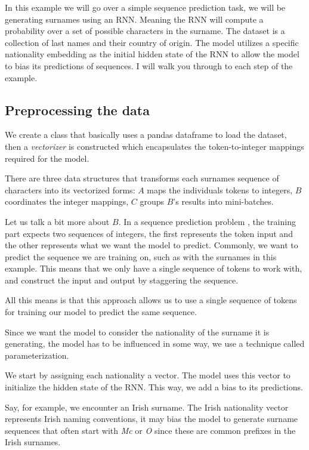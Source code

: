 \documentclass[12pt]{IEEEtran}
\begin{document}
In this example we will go over a simple sequence prediction task, we will be
generating surnames using an RNN. Meaning the RNN will compute a probability
over a set of possible characters in the surname. The dataset is a collection
of last names and their country of origin. The model utilizes a specific
nationality embedding as the initial hidden state of the RNN to allow the model
to bias its predictions of sequences. I will walk you through to each step of
the example.

\subsection{Preprocessing the data}

We create a class that basically  uses a pandas dataframe to load the dataset,
then a \emph{vectorizer} is constructed which encapsulates the token-to-integer
mappings required for the model.

There are three data structures that transforms each surnames sequence of
characters into its vectorized forms: $A$ maps the individuals tokens to
integers, $B$ coordinates the integer mappings, $C$ groups $B$'s results
into mini-batches.

Let us talk a bit more about $B$. In a sequence prediction problem , the
training part expects two sequences of integers, the first represents the
token input and the other represents what we want the model to predict.
Commonly, we want to predict the sequence we are training on, such as with the
surnames in this example. This means that we only have a single sequence of
tokens to work with, and construct the input and output by staggering the
sequence.

All this means is that this approach allows us to use a single sequence of tokens for
training our model to predict the same sequence.

Since we want the model to consider the nationality of the surname it is
generating, the model has to be influenced in some way, we use a technique
called parameterization.

We start by assigning each nationality a vector. The model uses this vector to
initialize the hidden state of the RNN. This way, we add a bias to its
predictions.

Say, for example, we encounter an Irish surname. The Irish nationality vector
represents Irish naming conventions, it may bias the model to generate surname
sequences that often start with \emph{Mc} or \emph{O} since these are common
prefixes in the Irish surnames.
\end{document}
